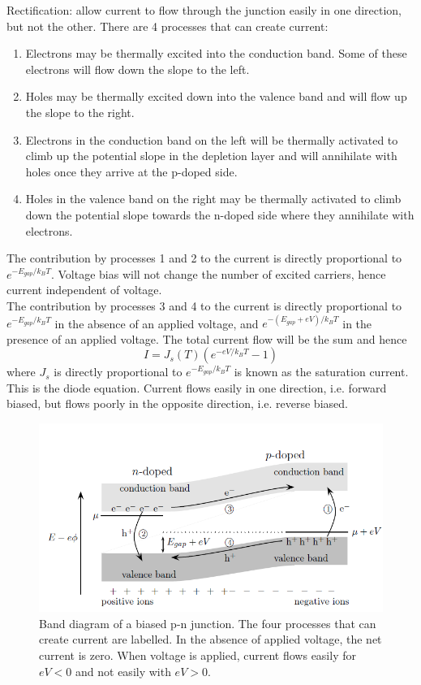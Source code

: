 \documentclass[a4paper]{article}
\begin{document}
\newpage
\begin{eg}[Rectification]
Rectification: allow current to flow through the junction easily in one direction, but not the other. There are 4 processes that can create current:
\begin{enumerate}
    \item Electrons may be thermally excited into the conduction band. Some of these electrons will flow down the slope to the left.
    \item Holes may be thermally excited down into the valence band and will flow up the slope to the right. 
    \item Electrons in the conduction band on the left will be thermally activated to climb up the potential slope in the depletion layer and will annihilate with holes once they arrive at the p-doped side. 
    \item Holes in the valence band on the right may be thermally activated to climb down the potential slope towards the n-doped side where they annihilate with electrons.
\end{enumerate}
The contribution by processes 1 and 2 to the current is directly proportional to $e^{-E_{gap}/k_BT}$. Voltage bias will not change the number of excited carriers, hence current independent of voltage.\\[5pt]
The contribution by processes 3 and 4 to the current is directly proportional to $e^{-E_{gap}/k_BT}$ in the absence of an applied voltage, and $e^{-(E_{gap}+eV)/k_BT}$ in the presence of an applied voltage. The total current flow will be the sum and hence
$$I=J_s(T)(e^{-eV/k_BT}-1)$$
where $J_s$ is directly proportional to $e^{-E_{gap}/k_BT}$ is known as the saturation current. This is the diode equation. Current flows easily in one direction, i.e. forward biased, but flows poorly in the opposite direction, i.e. reverse biased.
\end{eg}
\begin{figure}[H]
    \centering
    \includegraphics[width=\linewidth]{biasedPN.PNG}
    \caption{Band diagram of a biased p-n junction. The four processes that can create current are labelled. In the absence of applied voltage, the net current is zero. When voltage is applied, current flows easily for $eV<0$ and not easily with $eV>0$.~\cite{simon2013oxford} }
\end{figure}
\end{document}
